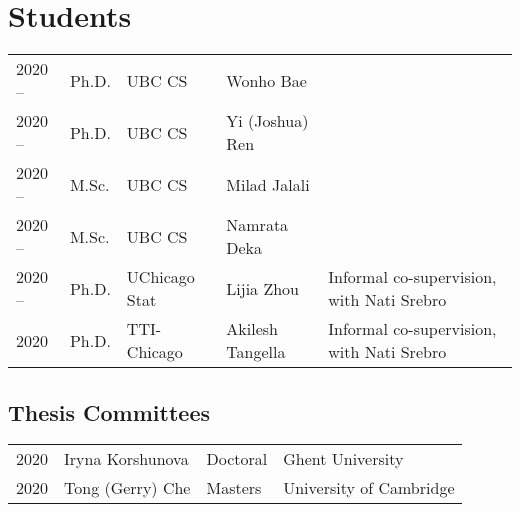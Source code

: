\documentclass[11pt,sans]{moderncv}
\begin{document}
\section{Students}
\begin{tabular}{l@{\hskip .2in}l@{\hskip .2in}l@{\hskip .2in}l@{\hskip .2in}l}
    2020 -- & Ph.D. & UBC CS & Wonho Bae &\\
    2020 -- & Ph.D. & UBC CS & Yi (Joshua) Ren &\\
    2020 -- & M.Sc. & UBC CS & Milad Jalali &\\
    2020 -- & M.Sc. & UBC CS & Namrata Deka &\\
    2020 -- & Ph.D. & UChicago Stat & Lijia Zhou & Informal co-supervision, with Nati Srebro \\
    2020 & Ph.D. & TTI-Chicago& Akilesh Tangella & Informal co-supervision, with Nati Srebro \\
\end{tabular}

\subsection{Thesis Committees}
\begin{tabular}{l@{\hskip .2in}l@{\hskip .2in}l@{\hskip .2in}l}
    2020 & Iryna Korshunova & Doctoral & Ghent University \\
    2020 & Tong (Gerry) Che & Masters & University of Cambridge 
\end{tabular}
\end{document}
